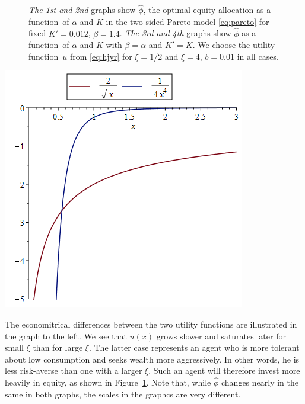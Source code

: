 \documentclass[11pt,a4]{amsart}
\newcommand{\fct}{function}
\newcommand{\1}{{\mathbf 1}}
\begin{document}
\begin{figure}[htb!]
\begin{minipage}{0.25\linewidth}
  \end{minipage}
 \caption{
   {\em The 1st and 2nd} graphs show $\hat\phi$, the optimal equity
   allocation as a \fct\ of $\alpha$ and $K$ in the two-sided Pareto model
   \eqref{eq:pareto} for fixed $K'=0.012$, $\beta = 1.4$.
   {\em The 3rd and 4th} graphs show $\hat\phi$ as a \fct\ of $\alpha$
   and $K$ with $\beta = \alpha$ and $K' = K$.
   We choose the utility \fct\ $u$ from \eqref{eq:hjyr} for $\xi = 1/2$
   and $\xi = 4$, $b = 0.01$ in all cases.
  }
  \label{fig:phi_hat_pareto}
\end{figure}

\begin{minipage}{0.5\linewidth}
  \includegraphics[width=\textwidth]{power_utilities.png}
\end{minipage}\hfill
\begin{minipage}{0.42\textwidth}
  The economitrical differences between the two utility functions
  are illustrated in the graph to the left.
  We see that
  $u(x)$ grows slower and saturates later for small $\xi$ than for
  large $\xi$. The latter case represents an agent who is more
  tolerant about low consumption and seeks wealth more
  aggressively. In other words, he is less risk-averse than one with a
  larger $\xi$. Such an agent will therefore invest more heavily in
  equity, as shown in Figure~\ref{fig:phi_hat_pareto}. Note that,
  while $\hat \phi$ changes nearly in the same in both graphs, the
  scales in the graphcs are very different.
\end{minipage}
\end{document}

